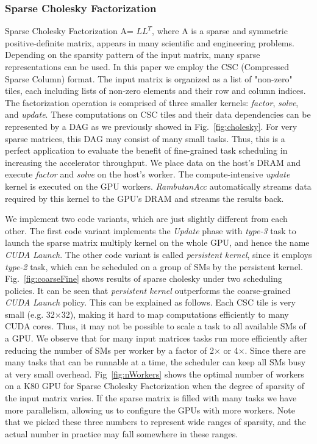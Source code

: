 \subsubsection{Sparse Cholesky Factorization}
Sparse Cholesky Factorization A= $LL^T$, where A is a sparse and symmetric positive-definite matrix,
appears in many scientific and engineering problems.
Depending on the sparsity pattern of the input matrix, many sparse representations can be used.
In this paper we employ the CSC (Compressed Sparse Column) format. 
The input matrix is organized as a list of "non-zero" tiles, each including lists of non-zero elements and their row and column indices.
The factorization operation is comprised of three smaller kernels: {\em factor}, {\em solve}, and {\em update}.
These computations on CSC tiles and their data dependencies can be represented by a DAG as we previously showed in Fig.~\ref{fig:cholesky}. 
For very sparse matrices, this DAG may consist of many small tasks.
Thus, this is a perfect application to evaluate the benefit of fine-grained task scheduling in increasing the accelerator throughput.
We place data on the host's DRAM and execute {\em factor} and {\em solve} on the host's worker.
The compute-intensive {\em update} kernel is executed on the GPU workers.
{\em RambutanAcc} automatically streams data required by this kernel to the GPU's DRAM and streams the results back.

We implement two code variants, which are just slightly different from each other.
The first code variant implements the {\em Update} phase with {\em type-3} task to launch the sparse matrix multiply kernel on the whole GPU, and hence the name {\em CUDA Launch}.
The other code variant is called {\em persistent kernel}, since it employs {\em type-2} task, which can be scheduled on a group of SMs by the persistent kernel. 
Fig.~\ref{fig:coarseFine} shows results of sparse cholesky under two scheduling policies.
It can be seen that {\em persistent kernel} outperforms the coarse-grained {\em CUDA Launch} policy.
This can be explained as follows.
Each CSC tile is very small (e.g. 32$\times$32), making it hard to map computations efficiently to many CUDA cores.
Thus, it may not be possible to scale a task to all available SMs of a GPU.
We observe that for many input matrices tasks run more efficiently after reducing the number of SMs per worker by a factor of 2$\times$ or 4$\times$.
Since there are many tasks that can be runnable at a time, the scheduler can keep all SMs busy at very small overhead.
Fig~\ref{fig:nWorkers} shows the optimal number of workers on a K80 GPU for Sparse Cholesky Factorization when the degree of sparsity of the input matrix varies.
If the sparse matrix is filled with many tasks we have more parallelism, allowing us to configure the GPUs with more workers.
Note that we picked these three numbers to represent wide ranges of sparsity, and the actual number in practice may fall somewhere in these ranges. 


